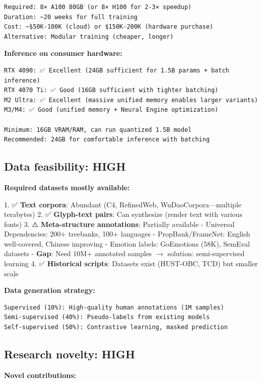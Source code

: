 \documentclass[11pt]{article}
\begin{document}
\begin{verbatim}
Required: 8× A100 80GB (or 8× H100 for 2-3× speedup)
Duration: ~20 weeks for full training
Cost: ~$50K-100K (cloud) or $150K-200K (hardware purchase)
Alternative: Modular training (cheaper, longer)
\end{verbatim}

\textbf{Inference on consumer hardware:}

\begin{verbatim}
RTX 4090: ✅ Excellent (24GB sufficient for 1.5B params + batch inference)
RTX 4070 Ti: ✅ Good (16GB sufficient with tighter batching)
M2 Ultra: ✅ Excellent (massive unified memory enables larger variants)
M3/M4: ✅ Good (unified memory + Neural Engine optimization)

Minimum: 16GB VRAM/RAM, can run quantized 1.5B model
Recommended: 24GB for comfortable inference with batching
\end{verbatim}

\subsection{Data feasibility: HIGH}

\textbf{Required datasets mostly available:}

1. ✅ \textbf{Text corpora}: Abundant (C4, RefinedWeb, WuDaoCorpora—multiple terabytes)
2. ✅ \textbf{Glyph-text pairs}: Can synthesize (render text with various fonts)
3. ⚠️ \textbf{Meta-structure annotations}: Partially available
   - Universal Dependencies: 200+ treebanks, 100+ languages
   - PropBank/FrameNet: English well-covered, Chinese improving
   - Emotion labels: GoEmotions (58K), SemEval datasets
   - \textbf{Gap}: Need 10M+ annotated samples \(\to\) solution: semi-supervised learning
4. ✅ \textbf{Historical scripts}: Datasets exist (HUST-OBC, TCD) but smaller scale

\textbf{Data generation strategy:}

\begin{verbatim}
Supervised (10%): High-quality human annotations (1M samples)
Semi-supervised (40%): Pseudo-labels from existing models
Self-supervised (50%): Contrastive learning, masked prediction
\end{verbatim}

\subsection{Research novelty: HIGH}

\textbf{Novel contributions:}
\end{document}

